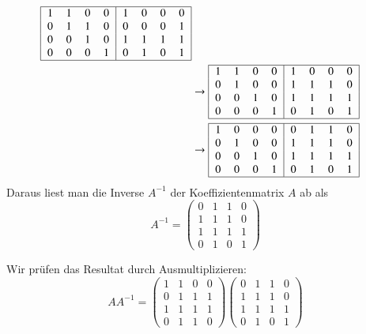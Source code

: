 \begin{loesung}
\begin{teilaufgaben}
\begin{align*}
\begin{tabular}{|>{$}c<{$}>{$}c<{$}>{$}c<{$}>{$}c<{$}|>{$}c<{$}>{$}c<{$}>{$}c<{$}>{$}c<{$}|}
\hline
   1 & 1 & 0 & 0 &  1 & 0 & 0 & 0 \\
   0 & 1 & 1 & 0 &  0 & 0 & 0 & 1 \\
   0 & 0 & 1 & 0 &  1 & 1 & 1 & 1 \\
   0 & 0 & 0 & 1 &  0 & 1 & 0 & 1 \\
\hline
\end{tabular}
\\
&\to
\begin{tabular}{|>{$}c<{$}>{$}c<{$}>{$}c<{$}>{$}c<{$}|>{$}c<{$}>{$}c<{$}>{$}c<{$}>{$}c<{$}|}
\hline
   1 & 1 & 0 & 0 &  1 & 0 & 0 & 0 \\
   0 & 1 & 0 & 0 &  1 & 1 & 1 & 0 \\
   0 & 0 & 1 & 0 &  1 & 1 & 1 & 1 \\
   0 & 0 & 0 & 1 &  0 & 1 & 0 & 1 \\
\hline
\end{tabular}
\\
&\to
\begin{tabular}{|>{$}c<{$}>{$}c<{$}>{$}c<{$}>{$}c<{$}|>{$}c<{$}>{$}c<{$}>{$}c<{$}>{$}c<{$}|}
\hline
   1 & 0 & 0 & 0 &  0 & 1 & 1 & 0 \\
   0 & 1 & 0 & 0 &  1 & 1 & 1 & 0 \\
   0 & 0 & 1 & 0 &  1 & 1 & 1 & 1 \\
   0 & 0 & 0 & 1 &  0 & 1 & 0 & 1 \\
\hline
\end{tabular}
\end{align*}
Daraus liest man die Inverse $A^{-1}$ der Koeffizientenmatrix $A$ ab als
\[
A^{-1}
=
\begin{pmatrix}
   0 & 1 & 1 & 0 \\
   1 & 1 & 1 & 0 \\
   1 & 1 & 1 & 1 \\
   0 & 1 & 0 & 1 
\end{pmatrix}
\]
\item Wir prüfen das Resultat durch Ausmultiplizieren:
\[
AA^{-1}
=
\begin{pmatrix}
   1 & 1 & 0 & 0 \\
   0 & 1 & 1 & 1 \\
   1 & 1 & 1 & 1 \\
   0 & 1 & 1 & 0 
\end{pmatrix}
\begin{pmatrix}
   0 & 1 & 1 & 0 \\
   1 & 1 & 1 & 0 \\
   1 & 1 & 1 & 1 \\
   0 & 1 & 0 & 1 

\end{pmatrix}\]
\end{teilaufgaben}
\end{loesung}
